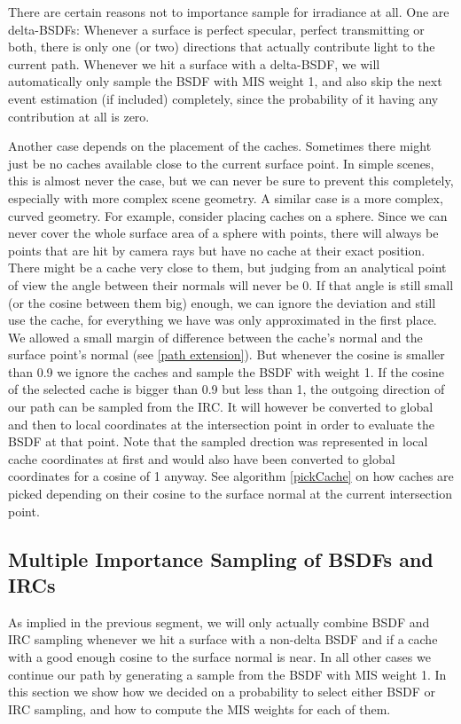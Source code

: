 There are certain reasons not to importance sample for irradiance at all. One are delta-BSDFs: Whenever a surface is perfect specular, perfect transmitting or both, there is only one (or two) directions that actually contribute light to the current path. Whenever we hit a surface with a delta-BSDF, we will automatically only sample the BSDF with MIS weight 1, and also skip the next event estimation (if included) completely, since the probability of it having any contribution at all is zero.

Another case depends on the placement of the caches. Sometimes there might just be no caches available close to the current surface point. In simple scenes, this is almost never the case, but we can never be sure to prevent this completely, especially with more complex scene geometry.\newline
A similar case is a more complex, curved geometry. For example, consider placing caches on a sphere. Since we can never cover the whole surface area of a sphere with points, there will always be points that are hit by camera rays but have no cache at their exact position. There might be a cache very close to them, but judging from an analytical point of view the angle between their normals will never be 0. If that angle is still small (or the cosine between them big) enough, we can ignore the deviation and still use the cache, for everything we have was only approximated in the first place. We allowed a small margin of difference between the cache's normal and the surface point's normal (see \ref{path extension}). But whenever the cosine is smaller than 0.9 we ignore the caches and sample the BSDF with weight 1.\newline
If the cosine of the selected cache is bigger than 0.9 but less than 1, the outgoing direction of our path can be sampled from the IRC. It will however be converted to global and then to local coordinates at the intersection point in order to evaluate the BSDF at that point. Note that the sampled drection was represented in local cache coordinates at first and would also have been converted to global coordinates for a cosine of 1 anyway. See algorithm \ref{pickCache} on how caches are picked depending on their cosine to the surface normal at the current intersection point.




\subsection{Multiple Importance Sampling of BSDFs and IRCs}
\label{mis_BSDF_irc}
As implied in the previous segment, we will only actually combine BSDF and IRC sampling whenever we hit a surface with a non-delta BSDF and if a cache with a good enough cosine to the surface normal is near. In all other cases we continue our path by generating a sample from the BSDF with MIS weight 1.\newline
In this section we show how we decided on a probability to select either BSDF or IRC sampling, and how to compute the MIS weights for each of them.


